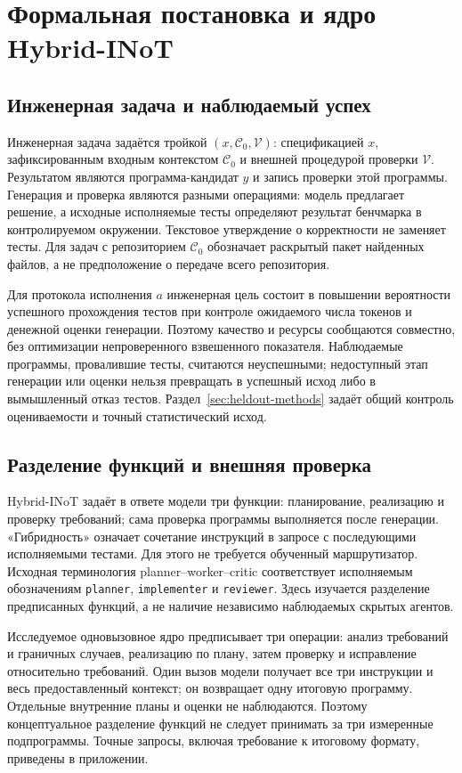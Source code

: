 \section{Формальная постановка и ядро Hybrid-INoT}
\label{sec:hybrid-core}

\subsection{Инженерная задача и наблюдаемый успех}
Инженерная задача задаётся тройкой $(x,\mathcal{C}_0,\mathcal{V})$: спецификацией $x$, зафиксированным входным контекстом $\mathcal{C}_0$ и внешней процедурой проверки $\mathcal{V}$. Результатом являются программа-кандидат $y$ и запись проверки этой программы. Генерация и проверка являются разными операциями: модель предлагает решение, а исходные исполняемые тесты определяют результат бенчмарка в контролируемом окружении. Текстовое утверждение о корректности не заменяет тесты. Для задач с репозиторием $\mathcal{C}_0$ обозначает раскрытый пакет найденных файлов, а не предположение о передаче всего репозитория.

Для протокола исполнения $a$ инженерная цель состоит в повышении вероятности успешного прохождения тестов при контроле ожидаемого числа токенов и денежной оценки генерации. Поэтому качество и ресурсы сообщаются совместно, без оптимизации непроверенного взвешенного показателя. Наблюдаемые программы, провалившие тесты, считаются неуспешными; недоступный этап генерации или оценки нельзя превращать в успешный исход либо в вымышленный отказ тестов. Раздел~\ref{sec:heldout-methods} задаёт общий контроль оцениваемости и точный статистический исход.

\subsection{Разделение функций и внешняя проверка}
Hybrid-INoT задаёт в ответе модели три функции: планирование, реализацию и проверку требований; сама проверка программы выполняется после генерации. «Гибридность» означает сочетание инструкций в запросе с последующими исполняемыми тестами. Для этого не требуется обученный маршрутизатор. Исходная терминология planner--worker--critic соответствует исполняемым обозначениям \texttt{planner}, \texttt{implementer} и \texttt{reviewer}. Здесь изучается разделение предписанных функций, а не наличие независимо наблюдаемых скрытых агентов.

Исследуемое одновызовное ядро предписывает три операции: анализ требований и граничных случаев, реализацию по плану, затем проверку и исправление относительно требований. Один вызов модели получает все три инструкции и весь предоставленный контекст; он возвращает одну итоговую программу. Отдельные внутренние планы и оценки не наблюдаются. Поэтому концептуальное разделение функций не следует принимать за три измеренные подпрограммы. Точные запросы, включая требование к итоговому формату, приведены в приложении.

